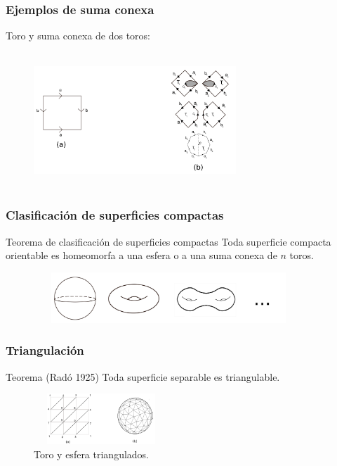 \documentclass{beamer}
\begin{document}
\begin{frame}
\frametitle{Ejemplos de suma conexa}
Toro y suma conexa de dos toros:
\begin{figure}[htb]
\begin{center}
\includegraphics[width=3in,height=2in]{imagenes/sumaconexa1.png}
\end{center}
\end{figure}
\end{frame}


\begin{frame}
\frametitle{Clasificación de superficies compactas}
\begin{block}{Teorema de clasificación de superficies compactas}
Toda superficie compacta orientable es homeomorfa a una esfera o a una suma conexa de $n$ toros.
\end{block}

\begin{figure}[htb]
\begin{center}
\includegraphics[width=4in,height=0.75in]{imagenes/diapo4.png} 
\end{center}
\end{figure}
\end{frame}

\begin{frame}
\frametitle{Triangulación}
\begin{block}{Teorema (Radó 1925)}
Toda superficie separable es triangulable.
\end{block}


\begin{figure}[htb]
\begin{center}
\includegraphics[width=2in,height=0.75in]{imagenes/diapo3.png} 
\caption{Toro y esfera triangulados.}
\end{center}
\end{figure}

\end{frame}
\end{document}
